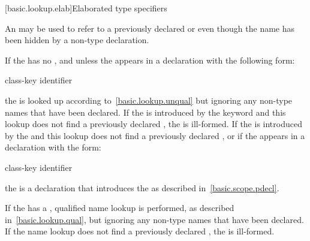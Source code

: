 [basic.lookup.elab]{Elaborated type specifiers}%
%

\pnum
An  may be
used to refer to a previously declared  or
 even though the name has been hidden by a non-type
declaration.

\pnum
If the  has no
, and unless the
 appears in a declaration with the
following form:

\begin{ncbnf}
class-key  identifier \terminal{;}
\end{ncbnf}

the  is looked up according
to~\ref{basic.lookup.unqual} but ignoring any non-type names that have
been declared. If the  is introduced
by the  keyword and this lookup does not find a previously
declared , the 
is ill-formed. If the  is introduced
by the  and this lookup does not find a previously
declared , or if the
 appears in a declaration with the
form:

\begin{ncbnf}
class-key  identifier \terminal{;}
\end{ncbnf}

the  is a declaration that
introduces the  as described
in~\ref{basic.scope.pdecl}.

\pnum
If the  has a
, qualified name lookup is performed, as
described in~\ref{basic.lookup.qual}, but ignoring any non-type names
that have been declared. If the name lookup does not find a previously
declared , the 
is ill-formed.

